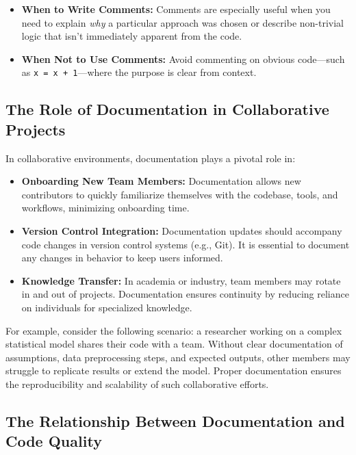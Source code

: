 \documentclass[
  letterpaper,
  DIV=11,
  numbers=noendperiod]{scrreprt}
\providecommand{\tightlist}{%
  \setlength{\itemsep}{0pt}\setlength{\parskip}{0pt}}\usepackage{longtable,booktabs,array}
\begin{document}
\begin{itemize}
\tightlist
\item
  \textbf{When to Write Comments:} Comments are especially useful when
  you need to explain \emph{why} a particular approach was chosen or
  describe non-trivial logic that isn't immediately apparent from the
  code.
\item
  \textbf{When Not to Use Comments:} Avoid commenting on obvious
  code---such as \texttt{x\ =\ x\ +\ 1}---where the purpose is clear
  from context.
\end{itemize}

\hypertarget{the-role-of-documentation-in-collaborative-projects}{%
\subsection{The Role of Documentation in Collaborative
Projects}\label{the-role-of-documentation-in-collaborative-projects}}

In collaborative environments, documentation plays a pivotal role in:

\begin{itemize}
\tightlist
\item
  \textbf{Onboarding New Team Members:} Documentation allows new
  contributors to quickly familiarize themselves with the codebase,
  tools, and workflows, minimizing onboarding time.
\item
  \textbf{Version Control Integration:} Documentation updates should
  accompany code changes in version control systems (e.g., Git). It is
  essential to document any changes in behavior to keep users informed.
\item
  \textbf{Knowledge Transfer:} In academia or industry, team members may
  rotate in and out of projects. Documentation ensures continuity by
  reducing reliance on individuals for specialized knowledge.
\end{itemize}

For example, consider the following scenario: a researcher working on a
complex statistical model shares their code with a team. Without clear
documentation of assumptions, data preprocessing steps, and expected
outputs, other members may struggle to replicate results or extend the
model. Proper documentation ensures the reproducibility and scalability
of such collaborative efforts.

\hypertarget{the-relationship-between-documentation-and-code-quality}{%
\subsection{The Relationship Between Documentation and Code
Quality}\label{the-relationship-between-documentation-and-code-quality}}
\end{document}
